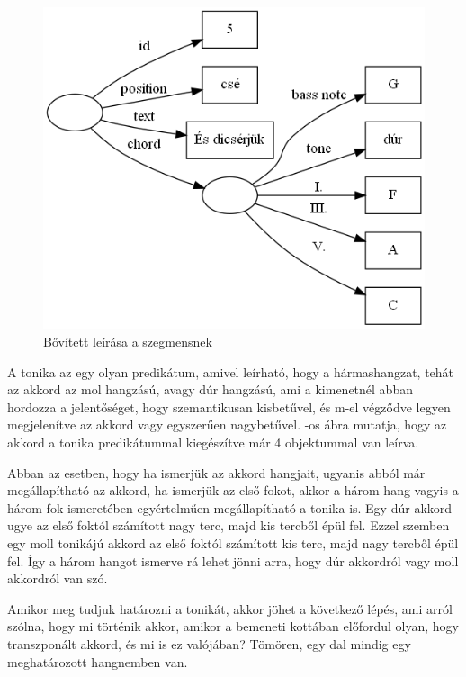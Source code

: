 \begin{figure}[h]
	\centering
	\includegraphics[scale=0.5]{images/img_src/rdf_graph_4.png}
	\caption{Bővített leírása a szegmensnek}
	\label{fig:graph4}
\end{figure}

A tonika az egy olyan predikátum, amivel leírható, hogy a hármashangzat, tehát az akkord az mol hangzású, avagy dúr hangzású, ami a kimenetnél abban hordozza a jelentőséget, hogy szemantikusan kisbetűvel, és m-el végződve legyen megjelenítve az akkord vagy egyszerűen nagybetűvel. -os ábra mutatja, hogy az akkord a tonika predikátummal kiegészítve már 4 objektummal van leírva.

Abban az esetben, hogy ha ismerjük az akkord hangjait, ugyanis abból már megállapítható az akkord, ha ismerjük az első fokot, akkor a három hang vagyis a három fok ismeretében egyértelműen megállapítható a tonika is. Egy dúr akkord ugye az első foktól számított nagy terc, majd kis tercből épül fel. Ezzel szemben egy moll tonikájú akkord az első foktól számított kis terc, majd nagy tercből épül fel. Így a három hangot ismerve rá lehet jönni arra, hogy dúr akkordról vagy moll akkordról van szó.

Amikor meg tudjuk határozni a tonikát, akkor jöhet a következő lépés, ami arról szólna, hogy mi történik akkor, amikor a bemeneti kottában előfordul olyan, hogy transzponált akkord, és mi is ez valójában? Tömören, egy dal mindig egy meghatározott hangnemben van.

